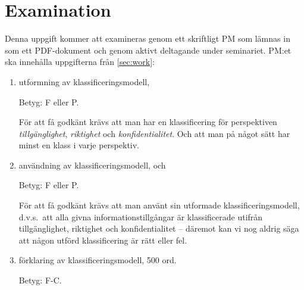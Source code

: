 \documentclass[a4paper]{llncs}
\begin{document}
\section{Examination}
\label{sec:examination}

Denna uppgift kommer att examineras genom ett skriftligt PM som lämnas in som 
ett PDF-dokument och genom aktivt deltagande under seminariet.
PM:et ska innehålla uppgifterna från \cref{sec:work}:
\begin{enumerate}
  \item utformning av klassificeringsmodell,
    \begin{solution}
      Betyg: F eller P.

      För att få godkänt krävs att man har en klassificering för perspektiven 
      \emph{tillgänglighet}, \emph{riktighet} och \emph{konfidentialitet}.
      Och att man på något sätt har minst en klass i varje perspektiv.
    \end{solution}

  \item användning av klassificeringsmodell, och
    \begin{solution}
      Betyg: F eller P.

      För att få godkänt krävs att man använt sin utformade 
      klassificeringsmodell, d.v.s.\ att alla givna informationstillgångar är 
      klassificerade utifrån tillgänglighet, riktighet och konfidentialitet --
      däremot kan vi nog aldrig säga att någon utförd klassificering är rätt 
      eller fel.
    \end{solution}

  \item förklaring av klassificeringsmodell, 500 ord.
    \begin{solution}
      Betyg: F-C.


\end{solution}
\end{enumerate}
\end{document}
